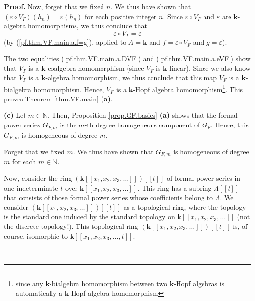 \documentclass[numbers=enddot,12pt,final,onecolumn,notitlepage]{scrartcl}%
\theoremstyle{definition}
\newenvironment{proof}[1][Proof]{\noindent\textbf{#1.} }{\ \rule{0.5em}{0.5em}}
\newenvironment{verlong}{}{}
\begin{document}
\begin{verlong}
\begin{proof}
Now, forget that we fixed $n$. We thus have shown that $\left(  \varepsilon
\circ V_{F}\right)  \left(  h_{n}\right)  =\varepsilon\left(  h_{n}\right)  $
for each positive integer $n$. Since $\varepsilon\circ V_{F}$ and
$\varepsilon$ are $\mathbf{k}$-algebra homomorphisms, we thus conclude that%
\begin{equation}
\varepsilon\circ V_{F}=\varepsilon\label{pf.thm.VF.main.a.eVF}%
\end{equation}
(by (\ref{pf.thm.VF.main.a.f=g}), applied to $A=\mathbf{k}$ and $f=\varepsilon
\circ V_{F}$ and $g=\varepsilon$).

The two equalities (\ref{pf.thm.VF.main.a.DVF}) and
(\ref{pf.thm.VF.main.a.eVF}) show that $V_{F}$ is a $\mathbf{k}$-coalgebra
homomorphism (since $V_{F}$ is $\mathbf{k}$-linear). Since we also know that
$V_{F}$ is a $\mathbf{k}$-algebra homomorphism, we thus conclude that this map
$V_{F}$ is a $\mathbf{k}$-bialgebra homomorphism. Hence, $V_{F}$ is a
$\mathbf{k}$-Hopf algebra homomorphism\footnote{since any $\mathbf{k}%
$-bialgebra homomorphism between two $\mathbf{k}$-Hopf algebras is
automatically a $\mathbf{k}$-Hopf algebra homomorphism}. This proves Theorem
\ref{thm.VF.main} \textbf{(a)}.

\textbf{(c)} Let $m\in\mathbb{N}$. Then, Proposition \ref{prop.GF.basics}
\textbf{(a)} shows that the formal power series $G_{F,m}$ is the $m$-th degree
homogeneous component of $G_{F}$. Hence, this $G_{F,m}$ is homogeneous of
degree $m$.

Forget that we fixed $m$. We thus have shown that $G_{F,m}$ is homogeneous of
degree $m$ for each $m\in\mathbb{N}$.

Now, consider the ring $\left(  \mathbf{k}\left[  \left[  x_{1},x_{2}%
,x_{3},\ldots\right]  \right]  \right)  \left[  \left[  t\right]  \right]  $
of formal power series in one indeterminate $t$ over $\mathbf{k}\left[
\left[  x_{1},x_{2},x_{3},\ldots\right]  \right]  $. This ring has a subring
$\Lambda\left[  \left[  t\right]  \right]  $ that consists of those formal
power series whose coefficients belong to $\Lambda$. We consider $\left(
\mathbf{k}\left[  \left[  x_{1},x_{2},x_{3},\ldots\right]  \right]  \right)
\left[  \left[  t\right]  \right]  $ as a topological ring, where the topology
is the standard one induced by the standard topology on $\mathbf{k}\left[
\left[  x_{1},x_{2},x_{3},\ldots\right]  \right]  $ (not the discrete
topology!). This topological ring $\left(  \mathbf{k}\left[  \left[
x_{1},x_{2},x_{3},\ldots\right]  \right]  \right)  \left[  \left[  t\right]
\right]  $ is, of course, isomorphic to $\mathbf{k}\left[  \left[  x_{1}%
,x_{2},x_{3},\ldots,t\right]  \right]  $.


\end{proof}
\end{verlong}
\end{document}
